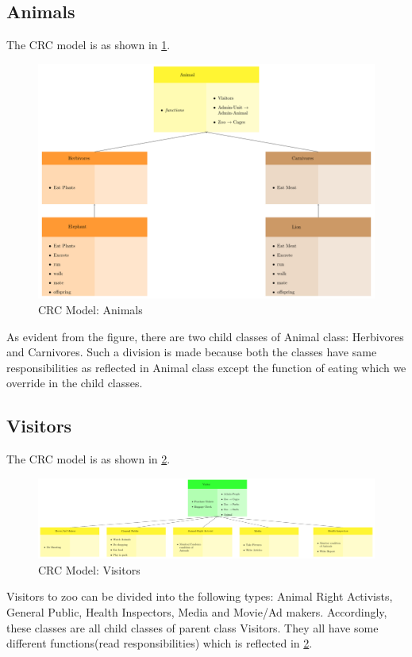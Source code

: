 \documentclass[paper=a4, fontsize=11pt]{scrartcl} %
\numberwithin{equation}{section} %
\numberwithin{figure}{section} %
\numberwithin{table}{section} %
\begin{document}
\subsection{Animals\label{Animal}}
The CRC model is as shown in \ref{figure:Animals}.
\begin{figure}
\centering
\includegraphics[width = 18cm]{Animal.pdf}
\caption{CRC Model: Animals \label{figure:Animals}}
\end{figure}
As evident from the figure, there are two child classes of Animal class: Herbivores and Carnivores. Such a division is made because both the classes have same responsibilities as reflected in Animal class except the function of eating which we override in the child classes.

\subsection{Visitors\label{Visitors}}
The CRC model is as shown in \ref{figure:Visitors}.
\begin{figure}
\centering
\includegraphics[width = 18cm]{diagram2.pdf}
\caption{CRC Model: Visitors \label{figure:Visitors}}
\end{figure}
Visitors to zoo can be divided into the following types: Animal Right Activists, General Public, Health Inspectors, Media and Movie/Ad makers. Accordingly, these classes are all child classes of parent class Visitors. They all have some different functions(read responsibilities) which is reflected in \ref{figure:Visitors}.
 
\end{document}
